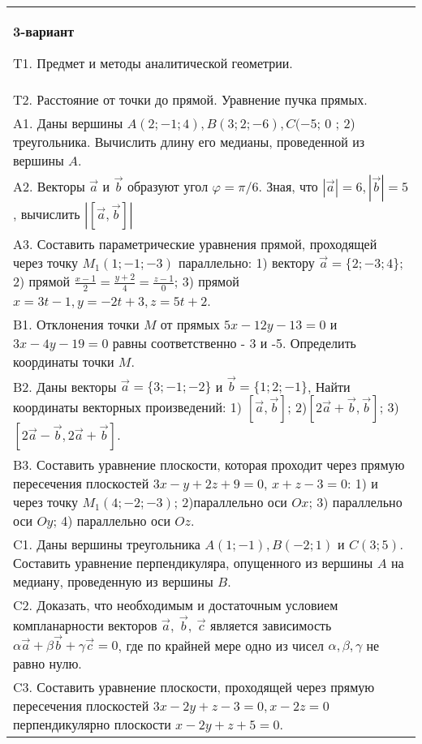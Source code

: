 \documentclass{article}
\begin{document}
\begin{tabular}{m{17cm}}
\textbf{3-вариант}
\newline

T1. Предмет и методы аналитической геометрии.
 \\
T2. 
Расстояние от точки до прямой. Уравнение пучка прямых.
 \\
A1. 
Даны вершины \(A(2; - 1;4),B(3;2; - 6),C( - 5\); 0 ; 2) треугольника. Вычислить длину его медианы, проведенной из вершины \(A\). \\
A2. 
Векторы \(\overrightarrow{a}\) и \(\overrightarrow{b}\) образуют угол \(\varphi = \pi/6\). Зная, что \(|\overrightarrow{a}| = 6,|\overrightarrow{b}| = 5\), вычислить \(\left| \left\lbrack \overrightarrow{a},\overrightarrow{b} \right\rbrack \right|\)
 \\
A3. 
Составить параметрические уравнения прямой, проходящей через точку \(M_{1}(1; - 1; - 3)\) параллельно: 1) вектору \(\overrightarrow{a} = \{ 2; - 3;4\}\); 2) прямой \(\frac{x - 1}{2} = \frac{y + 2}{4} = \frac{z - 1}{0}\); 3) прямой \(x = 3t - 1,y = - 2t + 3,z = 5t + 2\).
 \\
B1. 
Отклонения точки \(M\) от прямых \(5x - 12y - 13 = 0\) и \(3x - 4y - 19 = 0\) равны соответственно - 3 и -5. Определить координаты точки \(M\).
 \\
B2. 
Даны векторы \(\overrightarrow{a} = \{ 3; - 1; - 2\}\) и \(\overrightarrow{b} = \{ 1;2; - 1\}\), Найти координаты векторных произведений: 1) \(\left\lbrack \overrightarrow{a},\overrightarrow{b} \right\rbrack\); 2)\(\left\lbrack 2\overrightarrow{a} + \overrightarrow{b},\overrightarrow{b} \right\rbrack\); 3) \(\left\lbrack 2\overrightarrow{a} - \overrightarrow{b},2\overrightarrow{a} + \overrightarrow{b} \right\rbrack\).
 \\
B3. 
Составить уравнение плоскости, которая проходит через прямую пересечения плоскостей \(3x - y + 2z + 9 = 0\), \(x + z - 3 = 0\): 1) и через точку \(M_{1}(4; - 2; - 3)\); 2)параллельно оси \(Ox\); 3) параллельно оси \(Oy\); 4) параллельно оси \(Oz\).
 \\
C1. 
Даны вершины треугольника \(A(1; - 1),B( - 2;1)\) и \(C(3;5)\). Составить уравнение перпендикуляра, опущенного из вершины \(A\) на медиану, проведенную из вершины \(B\).
 \\
C2. 
Доказать, что необходимым и достаточным условием компланарности векторов \(\overrightarrow{a},\ \overrightarrow{b},\ \overrightarrow{c}\) является зависимость \(\alpha\overrightarrow{a} + \beta\overrightarrow{b} + \gamma\overrightarrow{c} = 0\), где по крайней мере одно из чисел \(\alpha,\beta,\gamma\) не равно нулю. \\
C3. 
Составить уравнение плоскости, проходящей через прямую пересечения плоскостей \(3x - 2y + z - 3 = 0,x - 2z = 0\) перпендикулярно плоскости \(x - 2y + z + 5 = 0\).
 \\

\end{tabular}
\vspace{1cm}
\end{document}
